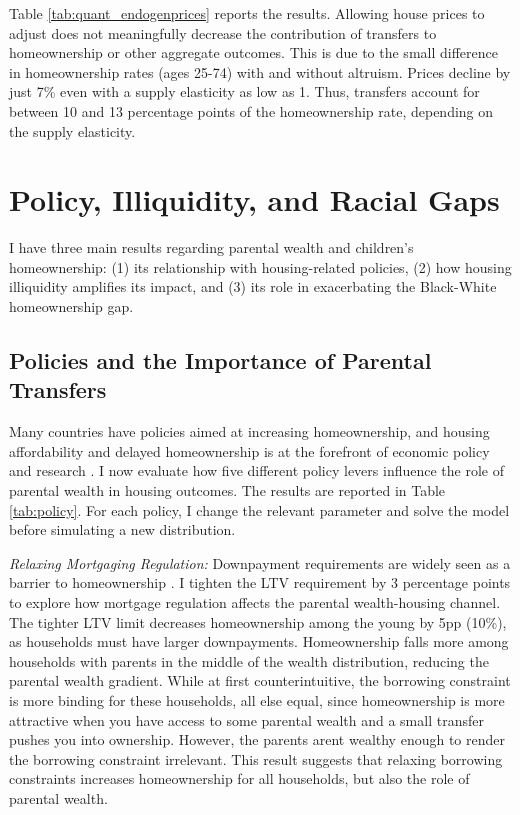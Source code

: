 \documentclass[12pt]{article}
\begin{document}
Table \ref{tab:quant_endogenprices} reports the results. Allowing house prices to adjust does not meaningfully decrease the contribution of transfers to homeownership or other aggregate outcomes. This is due to the small difference in homeownership rates (ages 25-74) with and without altruism. Prices decline by just 7\% even with a supply elasticity as low as 1. Thus, transfers account for between 10 and 13 percentage points of the homeownership rate, depending on the supply elasticity.

\section{Policy, Illiquidity, and Racial Gaps}\label{sec:pol}
I have three main results regarding parental wealth and children's homeownership: (1) its relationship with housing-related policies, (2) how housing illiquidity amplifies its impact, and (3) its role in exacerbating the Black-White homeownership gap.

\subsection{Policies and the Importance of Parental Transfers}
Many countries have policies aimed at increasing homeownership, and housing affordability and delayed homeownership is at the forefront of economic policy and research \citep[see e.g.,][]{Mabille2020}. I now evaluate how five different policy levers influence the role of parental wealth in housing outcomes. The results are reported in Table \ref{tab:policy}. For each policy, I change the relevant parameter and solve the model before simulating a new distribution.

\textit{Relaxing Mortgaging Regulation:} Downpayment requirements are widely seen as a barrier to homeownership \citep[see e.g.,][]{Lee2018,Guiso2002}. I tighten the LTV requirement by 3 percentage points to explore how mortgage regulation affects the parental wealth-housing channel. The tighter LTV limit decreases homeownership among the young by 5pp (10\%), as households must have larger downpayments. Homeownership falls more among households with parents in the middle of the wealth distribution, reducing the parental wealth gradient. While at first counterintuitive, the borrowing constraint is more binding for these households, all else equal, since homeownership is more attractive when you have access to some parental wealth and a small transfer pushes you into ownership. However, the parents arent wealthy enough to render the borrowing constraint irrelevant.  This result suggests that relaxing borrowing constraints increases homeownership for all households, but also the role of parental wealth.
\end{document}
